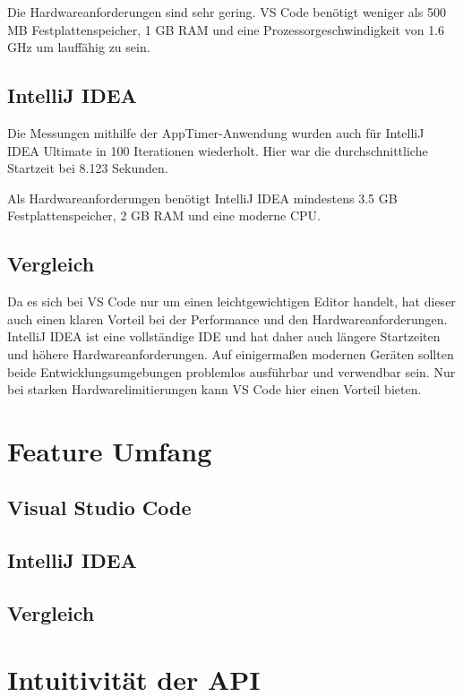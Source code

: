 Die Hardwareanforderungen sind sehr gering. VS Code benötigt weniger
als 500 MB Festplattenspeicher, 1 GB RAM und eine Prozessorgeschwindigkeit
von 1.6 GHz um lauffähig zu sein.

\subsection{IntelliJ IDEA}

Die Messungen mithilfe der AppTimer-Anwendung wurden auch
für IntelliJ IDEA Ultimate in 100 Iterationen wiederholt.
Hier war die durchschnittliche Startzeit bei 8.123 Sekunden.

Als Hardwareanforderungen benötigt IntelliJ IDEA
mindestens 3.5 GB Festplattenspeicher, 2 GB RAM und eine
moderne CPU.

\subsection{Vergleich}

Da es sich bei VS Code nur um einen leichtgewichtigen Editor handelt,
hat dieser auch einen klaren Vorteil bei der Performance 
und den Hardwareanforderungen.
IntelliJ IDEA ist eine vollständige IDE und hat daher auch längere
Startzeiten und höhere Hardwareanforderungen.
Auf einigermaßen modernen Geräten sollten beide Entwicklungsumgebungen
problemlos ausführbar und verwendbar sein. Nur bei starken
Hardwarelimitierungen kann VS Code hier einen Vorteil bieten.


\section{Feature Umfang}
\label{sec:Vergleich_FeatureUmfang}

\subsection{Visual Studio Code}

\subsection{IntelliJ IDEA}

\subsection{Vergleich}


\section{Intuitivität der API}
\label{sec:Vergleich_Intuitivität}

